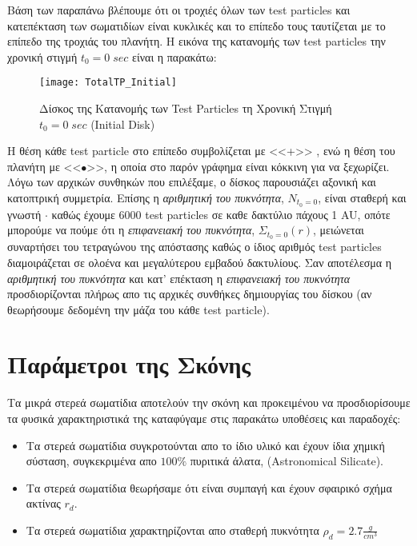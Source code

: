 Βάση των παραπάνω βλέπουμε ότι οι τροχιές όλων των {\en test particles} και κατεπέκταση των σωματιδίων είναι κυκλικές και το επίπεδο τους ταυτίζεται με το επίπεδο της τροχιάς του πλανήτη. Η εικόνα της κατανομής των {\en test particles} την χρονική στιγμή {\en $t_0=0 \; sec$} είναι η παρακάτω:

\begin{figure}[h]
  \centering
  \texttt{[image: TotalTP\_Initial]}
  \caption{Δίσκος της Κατανομής των {\en Test Particles} τη Χρονική Στιγμή {\en $t_0=0 \; sec$ (Initial Disk)}}\label{InitialDisc:figure}
\end{figure}

Η θέση κάθε {\en test particle} στο επίπεδο συμβολίζεται με <<+>> , ενώ η θέση του πλανήτη με <<$\bullet$>>, η οποία στο παρόν γράφημα είναι κόκκινη για να ξεχωρίζει.\\

Λόγω των αρχικών συνθηκών που επιλέξαμε, ο δίσκος παρουσιάζει αξονική και κατοπτρική συμμετρία. Επίσης η {\it αριθμητική του πυκνότητα}, $N_{t_0=0}$, είναι σταθερή και γνωστή $\cdot$ καθώς έχουμε 6000 {\en test particles} σε καθε δακτύλιο πάχους 1 {\en AU}, οπότε μπορούμε να πούμε ότι η {\it επιφανειακή του πυκνότητα}, $\Sigma_{t_0=0}(r)$, μειώνεται συναρτήσει του τετραγώνου της απόστασης καθώς ο ίδιος αριθμός {\en test particles} διαμοιράζεται σε ολοένα και μεγαλύτερου εμβαδού δακτυλίους. Σαν αποτέλεσμα η {\it αριθμητική του πυκνότητα} και κατ' επέκταση η {\it επιφανειακή του πυκνότητα} προσδιορίζονται πλήρως απο τις αρχικές συνθήκες δημιουργίας του δίσκου (αν θεωρήσουμε δεδομένη την μάζα του κάθε {\en test particle}).

\newpage

\section{Παράμετροι της Σκόνης} 

Τα μικρά στερεά σωματίδια αποτελούν την σκόνη και προκειμένου να προσδιορίσουμε τα φυσικά χαρακτηριστικά της καταφύγαμε στις παρακάτω υποθέσεις και παραδοχές:

\begin{itemize}
\item Τα στερεά σωματίδια συγκροτούνται απο το ίδιο υλικό και έχουν ίδια χημική σύσταση, συγκεκριμένα απο $100\%$ πυριτικά άλατα, ({\en Astronomical Silicate}).
\item Τα στερεά σωματίδια θεωρήσαμε ότι είναι συμπαγή και έχουν σφαιρικό σχήμα ακτίνας $r_d$.
\item Τα στερεά σωματίδια χαρακτηρίζονται απο σταθερή πυκνότητα $\rho_d = 2.7 \frac{g}{cm^3}$
\end{itemize}

